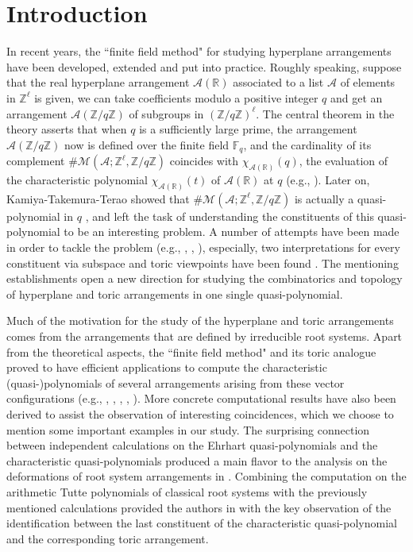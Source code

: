 \documentclass[12pt]{amsart}
\theoremstyle{plain}
\theoremstyle{definition}
\theoremstyle{remark}
\newcommand{\A}{\mathcal{A}}
\newcommand{\F}{\mathbb{F}}
\newcommand{\R}{\mathbb{R}}
\newcommand{\Z}{\mathbb{Z}}
\newcommand{\M}{\mathcal{M}}
\begin{document}
\section{Introduction}
In recent years, the ``finite field method" for studying hyperplane arrangements have been developed, extended and put into practice. 
Roughly speaking, suppose that the real hyperplane arrangement $\A(\R)$ associated to a list $\A$ of elements in $\Z^\ell$ is given, we can take coefficients modulo a positive integer $q$ and get an arrangement $\A(\Z/q\Z)$ of subgroups in $(\Z/q\Z)^\ell$. 
The central theorem in the theory asserts that when $q$ is a sufficiently large prime, the arrangement $\A(\Z/q\Z)$ now is defined over the finite field $\F_q$, and the cardinality of its complement $\#\M(\A; \Z^\ell, \Z/q\Z)$ coincides with $\chi_{\A(\R)}(q)$, the evaluation of the characteristic polynomial $\chi_{\A(\R)}(t)$ of $\A(\R)$ at $q$ (e.g., \cite[Theorem 2.2]{A96}). 
Later on, Kamiya-Takemura-Terao showed that $\#\M(\A; \Z^\ell, \Z/q\Z)$ is actually a quasi-polynomial in $q$  \cite{KTT08}, and left the task of understanding the constituents of this quasi-polynomial to be an interesting problem. 
A number of attempts have been made in order to tackle the problem (e.g., \cite{KTT08}, \cite{LTY17}, \cite{DFM17}), especially, two interpretations for every constituent via subspace and toric viewpoints have been found  \cite{TY18}. 
The mentioning establishments open a new direction for studying the combinatorics and topology of hyperplane and toric arrangements in one single quasi-polynomial.

Much of the motivation for the study of the hyperplane and toric arrangements comes from the arrangements that are defined by irreducible root systems. 
Apart from the theoretical aspects, the ``finite field method" and its toric analogue proved to have efficient applications to compute the characteristic (quasi-)polynomials of several arrangements arising from these vector configurations (e.g., \cite{A96}, \cite{BS98},  \cite{KTT07}, \cite{ACH15}, \cite{Y18L}).  
More concrete computational results have also been derived to assist the observation of interesting coincidences, which we choose to mention some important examples in our study. 
The surprising connection between independent calculations on the Ehrhart quasi-polynomials \cite{Su98} and the characteristic quasi-polynomials \cite{KTT07} produced a main flavor to the analysis on the deformations of root system arrangements in \cite{Y18W}.
Combining the computation on the arithmetic Tutte polynomials of classical root systems \cite{ACH15} with the previously mentioned calculations provided the authors in \cite{LTY17} with the key observation of the identification between the last constituent of the characteristic quasi-polynomial and the corresponding toric arrangement.
\end{document}
